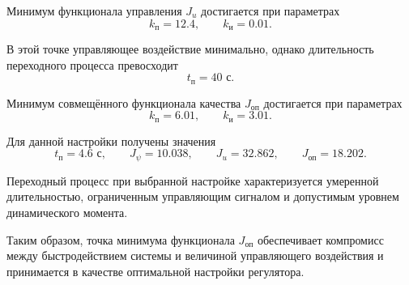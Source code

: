 Минимум функционала управления \(J_u\) достигается при параметрах
\begin{equation}
k_{\text{п}} = 12.4,
\qquad
k_{\text{и}} = 0.01.
\end{equation}

В этой точке управляющее воздействие минимально, однако длительность переходного процесса превосходит
\begin{equation}
t_{\text{п}} = 40 \text{ с}.
\end{equation}

Минимум совмещённого функционала качества \(J_{\text{оп}}\) достигается при параметрах
\begin{equation}
k_{\text{п}} = 6.01,
\qquad
k_{\text{и}} = 3.01.
\end{equation}

Для данной настройки получены значения
\begin{equation}
t_{\text{п}} = 4.6 \text{ с},
\qquad
J_{\psi} = 10.038,
\qquad
J_u = 32.862,
\qquad
J_{\text{оп}} = 18.202.
\end{equation}

Переходный процесс при выбранной настройке характеризуется умеренной длительностью, ограниченным управляющим сигналом и допустимым уровнем динамического момента.

Таким образом, точка минимума функционала \(J_{\text{оп}}\) обеспечивает компромисс между быстродействием системы и величиной управляющего воздействия и принимается в качестве оптимальной настройки регулятора.
